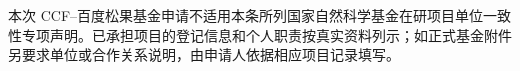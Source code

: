 \justifying
\NSFCBodyText

本次 CCF--百度松果基金申请不适用本条所列国家自然科学基金在研项目单位一致性专项声明。已承担项目的登记信息和个人职责按真实资料列示；如正式基金附件另要求单位或合作关系说明，由申请人依据相应项目记录填写。
